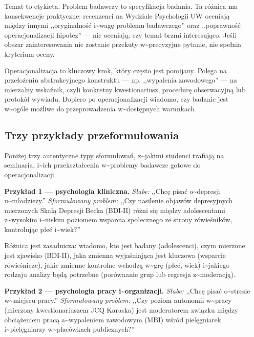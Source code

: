 \documentclass[12pt,a4paper,twoside,openany]{book}
\begin{document}
Temat to etykieta. Problem badawczy to specyfikacja badania. Ta różnica ma konsekwencje praktyczne: recenzenci na Wydziale Psychologii UW oceniają między innymi ,,oryginalność i\textasciitilde{}wagę problemu badawczego'' oraz ,,poprawność operacjonalizacji hipotez'' --- nie oceniają, czy temat brzmi interesująco. Jeśli obszar zainteresowania nie zostanie przekuty w\textasciitilde{}precyzyjne pytanie, nie spełnia kryterium oceny.


Operacjonalizacja to kluczowy krok, który często jest pomijany. Polega na przełożeniu abstrakcyjnego konstruktu --- np. ,,wypalenia zawodowego'' --- na mierzalny wskaźnik, czyli konkretny kwestionariusz, procedurę obserwacyjną lub protokół wywiadu. Dopiero po operacjonalizacji wiadomo, czy badanie jest w\textasciitilde{}ogóle możliwe do przeprowadzenia w\textasciitilde{}dostępnych warunkach.


\subsection{Trzy przykłady przeformułowania}


Poniżej trzy autentyczne typy sformułowań, z\textasciitilde{}jakimi studenci trafiają na seminaria, i\textasciitilde{}ich przekształcenia w\textasciitilde{}problemy badawcze gotowe do operacjonalizacji.


\textbf{Przykład 1 --- psychologia kliniczna.} \textit{Słabe:} ,,Chcę pisać o\textasciitilde{}depresji u\textasciitilde{}młodzieży.'' \textit{Sformułowany problem:} ,,Czy nasilenie objawów depresyjnych mierzonych Skalą Depresji Becka (BDI-II) różni się między adolescentami z\textasciitilde{}wysokim i\textasciitilde{}niskim poziomem wsparcia społecznego ze strony rówieśników, kontrolując płeć i\textasciitilde{}wiek?''


Różnica jest zasadnicza: wiadomo, kto jest badany (adolescenci), czym mierzone jest zjawisko (BDI-II), jaka zmienna wyjaśniająca jest kluczowa (wsparcie rówieśnicze), jakie zmienne kontrolne wchodzą w\textasciitilde{}grę (płeć, wiek) i\textasciitilde{}jakiego rodzaju analizy będą potrzebne (porównanie grup lub regresja z\textasciitilde{}moderacją).


\textbf{Przykład 2 --- psychologia pracy i\textasciitilde{}organizacji.} \textit{Słabe:} ,,Chcę pisać o\textasciitilde{}stresie w\textasciitilde{}miejscu pracy.'' \textit{Sformułowany problem:} ,,Czy poziom autonomii w\textasciitilde{}pracy (mierzony kwestionariuszem JCQ Karaska) jest moderatorem związku między obciążeniem pracą a\textasciitilde{}wypaleniem zawodowym (MBI) wśród pielęgniarek i\textasciitilde{}pielęgniarzy w\textasciitilde{}placówkach publicznych?''
\end{document}
